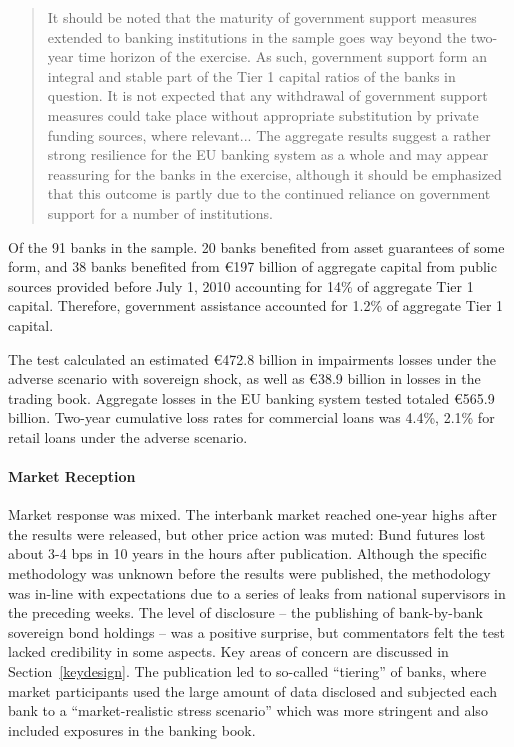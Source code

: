 \documentclass[12pt]{article}
\begin{document}
\begin{quote}
It should be noted that the maturity of government support measures extended to banking institutions in the sample goes way beyond the two-year time horizon of the exercise. As such, government support form an integral and stable part of the Tier 1 capital ratios of the banks in question. It is not expected that any withdrawal of government support measures could take place without appropriate substitution by private funding sources, where relevant... The aggregate results suggest a rather strong resilience for the EU banking
system as a whole and may appear reassuring for the banks in the exercise,
although it should be emphasized that this outcome is partly due to the
continued reliance on government support for a number of institutions.
\end{quote}

Of the 91 banks in the sample. 20 banks benefited from asset guarantees of some form, and 38  banks benefited from \euro{197} billion of aggregate capital from public sources provided before July 1, 2010 accounting for 14\% of aggregate Tier 1 capital. Therefore, government assistance accounted for 1.2\% of aggregate Tier 1 capital.

The test calculated an estimated \euro{472.8} billion in impairments losses under the adverse scenario with sovereign shock, as well as \euro{38.9} billion in losses in the trading book. Aggregate losses in the EU banking system tested totaled \euro{565.9} billion. Two-year cumulative loss rates for commercial loans was 4.4\%, 2.1\% for retail loans under the adverse scenario.

\paragraph{Market Reception} Market response was mixed. The interbank market reached one-year highs after the results were released, but other price action was muted: Bund futures lost about 3-4 bps in 10 years in the hours after publication. Although the specific methodology was unknown before the results were published, the methodology was in-line with expectations due to a series of leaks from national supervisors in the preceding weeks. The level of disclosure -- the publishing of bank-by-bank sovereign bond holdings -- was a positive surprise, but commentators felt the test lacked credibility in some aspects. Key areas of concern are discussed in Section~\ref{keydesign}. The publication led to so-called ``tiering'' of banks, where market participants used the large amount of data disclosed and subjected each bank to a ``market-realistic stress scenario'' which was more stringent and also included exposures in the banking book. \citep{Nedialkov}
\end{document}
